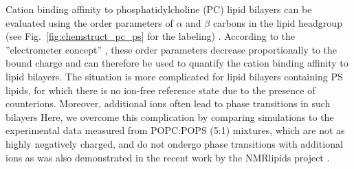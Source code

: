 \documentclass[journal=jpcbfk,manuscript=article]{achemso}
\begin{document}
Cation binding affinity to phosphatidylcholine (PC) lipid bilayers can be evaluated using 
the order parameters of $\alpha$ and $\beta$ carbons in the lipid headgroup 
(see Fig.~\ref{fig:chemstruct_pc_ps} for the labeling) \cite{catte16}.
According to the ''electrometer concept'' \citep{seelig87}, these order parameters decrease
proportionally to the bound charge and can therefore be used to quantify the cation binding
affinity to lipid bilayers. The situation is more complicated for lipid bilayers containing
PS lipids, for which there is no ion-free reference state due to the presence of counterions.
Moreover, additional ions often lead to phase transitions in such bilayers \cite{nmrlipids_proj4,feigenson86,mattai89,roux91,roux90}
Here, we overcome this complication by comparing simulations to the experimental data 
measured from POPC:POPS (5:1) mixtures, 
which are not as highly negatively charged, 
and do not ondergo phase transitions with additional ions \cite{roux90} 
as was also demonstrated in the recent work by the NMRlipids project \cite{nmrlipids_proj4}.


 
\end{document}
